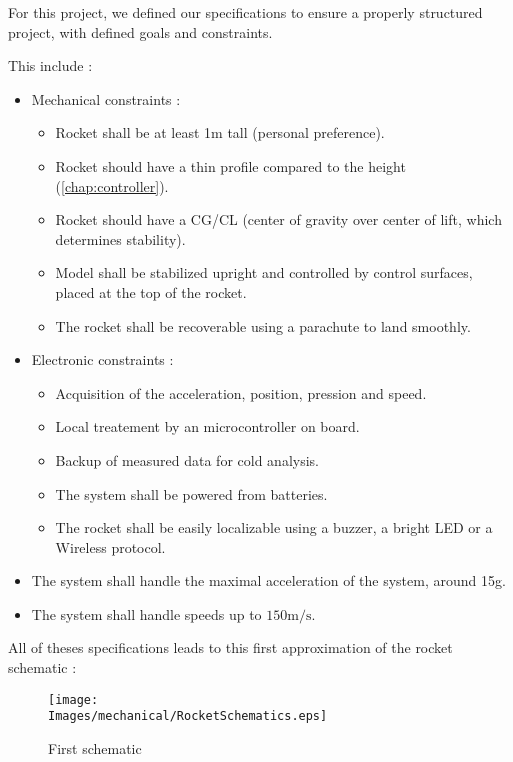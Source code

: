 For this project, we defined our specifications to ensure a properly structured
project, with defined goals and constraints.

This include :

\begin{itemize}
    \item Mechanical constraints :
          \begin{itemize}[noitemsep]
              \item Rocket shall be at least 1m tall (personal preference).
              \item Rocket should have a thin profile compared to the height (\ref{chap:controller}).
              \item Rocket should have a CG/CL (center of gravity over center of lift, which determines stability).
              \item Model shall be stabilized upright and controlled by control surfaces, placed at the top of the rocket.
              \item The rocket shall be recoverable using a parachute to land smoothly.
          \end{itemize}

    \item Electronic constraints :
          \begin{itemize}[noitemsep]
              \item Acquisition of the acceleration, position, pression and speed.
              \item Local treatement by an microcontroller on board.
              \item Backup of measured data for cold analysis.
              \item The system shall be powered from batteries.
              \item The rocket shall be easily localizable using a buzzer, a bright LED or a Wireless protocol.
          \end{itemize}

    \item   The system shall handle the maximal acceleration of the system, around 15g.
    \item   The system shall handle speeds up to $150 \si{\meter\per\second}$.
\end{itemize}

\vspace{0.8 cm}

All of theses specifications leads to this first approximation of the rocket schematic :

\begin{figure}[!hbt]
    \centering
    \texttt{[image: \\Images/mechanical/RocketSchematics.eps]}
    \caption{First schematic}
\end{figure}
\FloatBarrier

